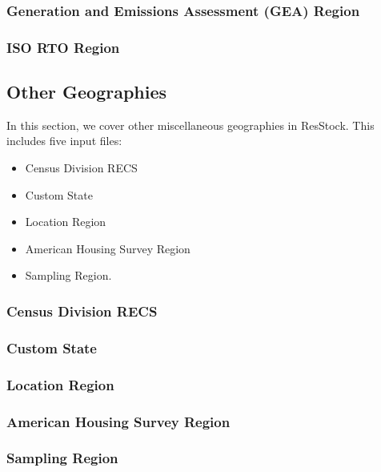 \subsubsection{Generation and Emissions Assessment (GEA) Region}


\subsubsection{ISO RTO Region}


\subsection{Other Geographies}

In this section, we cover other miscellaneous geographies in ResStock. This includes five input files:
\begin{itemize}
    \item Census Division RECS
    \item Custom State
    \item Location Region
    \item American Housing Survey Region
    \item Sampling Region.
\end{itemize}

\subsubsection{Census Division RECS}


\subsubsection{Custom State}


\subsubsection{Location Region}


\subsubsection{American Housing Survey Region}


\subsubsection{Sampling Region}


